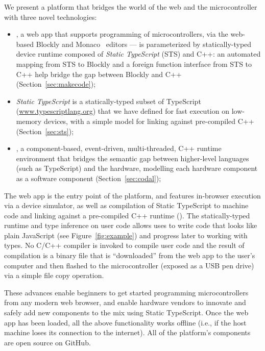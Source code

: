 We present a platform that bridges the world of the web and the microcontroller with three
novel technologies:
\begin{itemize}
\item \emph{\MCN}, a web app that supports programming of microcontrollers, via the web-based Blockly 
and Monaco~\cite{Monaco} editors ---
\MC is parameterized by statically-typed device runtime composed of \emph{Static TypeScript} (STS) and C++:
an automated mapping from STS to Blockly and a foreign function interface from STS to C++ help
bridge the gap between Blockly and C++ (Section~\ref{sec:makecode});

\item \emph{Static TypeScript} is a statically-typed subset of TypeScript 
(\url{www.typescriptlang.org}) that we have defined for fast execution on low-memory devices, 
with a simple model for linking against pre-compiled C++ (Section~\ref{sec:sts});

\item \emph{\CO}, a component-based, event-driven, multi-threaded, C++ runtime environment 
that bridges the semantic gap between higher-level languages (such as TypeScript) and the hardware,
modelling each hardware component as a software component (Section~\ref{sec:codal});

\end{itemize}
The \MC web app is the entry point of the platform, and features
in-browser execution via a device simulator, 
as well as compilation of Static TypeScript to machine code and linking against a pre-compiled C++ runtime (\emph{\CON}). 
The statically-typed runtime and type inference on user code allows uses to write code
that looks like plain JavaScript (see Figure~\ref{fig:example}) and progress later to working 
with types.
No C/C++ compiler is invoked to compile user code and the result of compilation is a 
binary file that is ``downloaded'' from the web app to the user's
computer and then flashed to the microcontroller (exposed as a USB pen drive)
via a simple file copy operation.

These advances enable beginners to get started programming microcontrollers from
any modern web browser, and enable hardware vendors to innovate and safely add new
components to the mix using Static TypeScript.
Once the web app has been loaded, all the above functionality works offline
(i.e., if the host machine loses its connection
to the internet). All of the platform's components are open source on GitHub.

